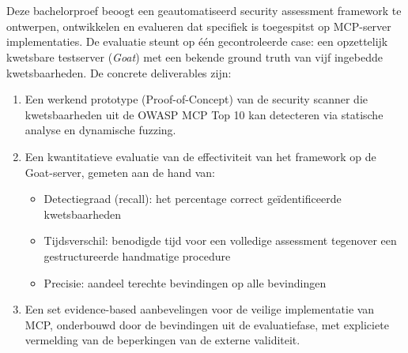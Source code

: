 \section{}%
\label{sec:onderzoeksdoelstelling}

Deze bachelorproef beoogt een geautomatiseerd security assessment framework te ontwerpen, ontwikkelen en evalueren dat specifiek is toegespitst op MCP-server implementaties. De evaluatie steunt op één gecontroleerde case: een opzettelijk kwetsbare testserver (\emph{Goat}) met een bekende ground truth van vijf ingebedde kwetsbaarheden. De concrete deliverables zijn:
\begin{enumerate}
  \item Een werkend prototype (Proof-of-Concept) van de security scanner die kwetsbaarheden uit de OWASP MCP Top 10 kan detecteren via statische analyse en dynamische fuzzing.
  \item Een kwantitatieve evaluatie van de effectiviteit van het framework op de Goat-server, gemeten aan de hand van:
        \begin{itemize}
          \item Detectiegraad (recall): het percentage correct geïdentificeerde kwetsbaarheden
          \item Tijdsverschil: benodigde tijd voor een volledige assessment tegenover een gestructureerde handmatige procedure
          \item Precisie: aandeel terechte bevindingen op alle bevindingen
        \end{itemize}
  \item Een set evidence-based aanbevelingen voor de veilige implementatie van MCP, onderbouwd door de bevindingen uit de evaluatiefase, met expliciete vermelding van de beperkingen van de externe validiteit.
\end{enumerate}



\section{}%
\label{sec:opzet-bachelorproef}

